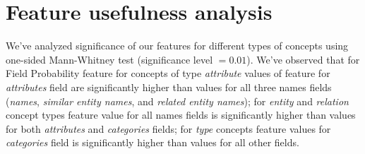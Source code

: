 \documentclass{article}
\begin{document}

\section{Feature usefulness analysis}

We've analyzed significance of our features for different types of concepts
using one-sided Mann-Whitney test (significance level $= 0.01$). We've observed
that for Field Probability feature for concepts of type \emph{attribute} values
of feature for \emph{attributes} field are significantly higher than values for
all three names fields (\emph{names}, \emph{similar entity names}, and
\emph{related entity names}); for \emph{entity} and \emph{relation} concept
types feature value for all names fields is significantly higher than values for
both \emph{attributes} and \emph{categories} fields; for \emph{type} concepts
feature values for \emph{categories} field is significantly higher than values
for all other fields.

{}

\end{document}
